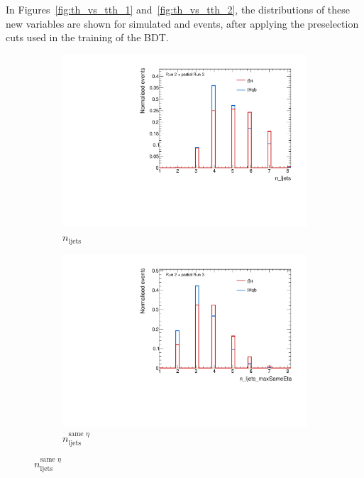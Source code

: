 In Figures~\ref{fig:th_vs_tth_1} and~\ref{fig:th_vs_tth_2}, the distributions of these new variables are shown for simulated \thqb and \ttH events, after applying the preselection cuts used in the training of the BDT.

\begin{figure}[htbp]
  \centering
  \begin{subfigure}[b]{0.45\textwidth}
    \centering
    \includegraphics[width=\textwidth]{images/plots_tH_tHqb_for_thesis/n_ljets_signals_ATLAS.pdf}
    \caption{$n_{\text{ljets}}$}
    \label{fig:n_ljets}
  \end{subfigure}
  \hfill
  \begin{subfigure}[b]{0.45\textwidth}
    \centering
    \includegraphics[width=\textwidth]{images/plots_tH_tHqb_for_thesis/n_ljets_maxSameEta_signals_ATLAS.pdf}
    \caption{$n_{\text{ljets}}^{\text{same }\eta}$}
    \label{fig:n_ljets_maxSameEta}
  \end{subfigure}


\end{figure}
